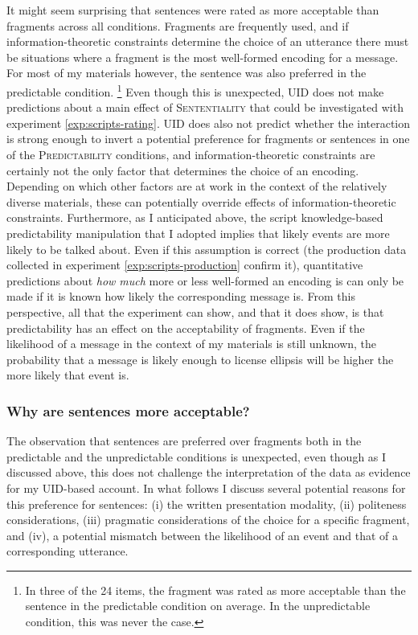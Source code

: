 It might seem surprising that sentences were rated as more acceptable than fragments across all conditions. Fragments are frequently used, and if informa\-tion-theoretic constraints determine the choice of an utterance there must be situations where a fragment is the most well-formed encoding for a message. For most of my materials however, the sentence was also preferred in the predictable condition.%
%
\footnote{In three of the 24 items, the fragment was rated as more acceptable than the sentence in the predictable condition on average. In the unpredictable condition, this was never the case.}\afterfn%
%
Even though this is unexpected, UID does not make predictions about a main effect of \textsc{Sententiality} that could be investigated with experiment \ref{exp:scripts-rating}. UID does also not predict whether the interaction is strong enough to invert a potential preference for fragments or sentences in one of the \textsc{Predictabi\-lity} conditions, and information-theoretic constraints are certainly not the only factor that determines the choice of an encoding. Depending on which other factors are at work in the context of the relatively diverse materials, these can potentially override effects of information-theoretic constraints. Furthermore, as I anticipated above, the script knowledge-based predictability manipulation that I adopted implies that likely events are more likely to be talked about. Even if this assumption is correct (the production data collected in experiment \ref{exp:scripts-production} confirm it), quantitative predictions about \textit{how much} more or less well-formed an encoding is can only be made if it is known how likely the corresponding message is. From this perspective, all that the experiment can show, and that it does show, is that predictability has an effect on the acceptability of fragments. Even if the likelihood of a message in the context of my materials is still unknown, the probability that a message is likely enough to license ellipsis will be higher the more likely that event is. 

\subsubsection{Why are sentences more acceptable?}

The observation that sentences are preferred over fragments both in the predictable and the unpredictable conditions is unexpected, even though as I discussed above, this does not challenge the interpretation of the data as evidence for my UID-based account. In what follows I discuss several potential reasons for this preference for sentences: (i) the written presentation modality, (ii) politeness considerations, (iii) pragmatic considerations of the choice for a specific fragment, and (iv), a potential mismatch between the likelihood of an event and that of a corresponding utterance. 

